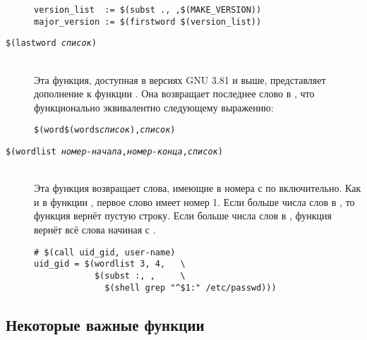 \begin{description}
{\footnotesize
\begin{verbatim}
version_list  := $(subst ., ,$(MAKE_VERSION))
major_version := $(firstword $(version_list))
\end{verbatim}
}

\item[\texttt{\${}(lastword \emph{список})}] \hfill \\
Эта функция, доступная в версиях GNU \GNUmake{} 3.81 и выше,
представляет дополнение к функции . Она возвращает
последнее слово в , что функционально эквивалентно
следующему выражению:

{\footnotesize
\begin{alltt}
\${}(word \${}(words \emph{список}),\emph{список})
\end{alltt}
}

\item[\texttt{\${}(wordlist \emph{номер-начала},\emph{номер-конца},\emph{список})}] \hfill \\
Эта функция возвращает слова, имеющие в  номера с
 по  включительно.
Как и в функции , первое слово имеет номер 1. Если
 больше числа слов в , то
функция вернёт пустую строку. Если  больше
числа слов в , функция вернёт всё слова начиная с
.

{\footnotesize
\begin{verbatim}
# $(call uid_gid, user-name)
uid_gid = $(wordlist 3, 4,   \
            $(subst :, ,     \
              $(shell grep "^$1:" /etc/passwd)))
\end{verbatim}
}
\end{description}

\subsection{Некоторые важные функции}
\label{sec:imp_misc_func}

